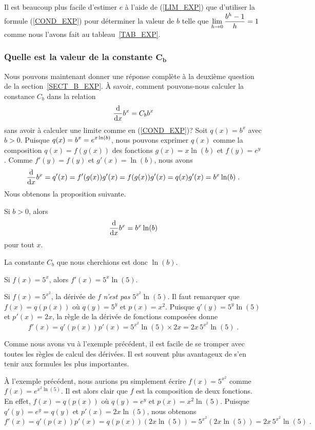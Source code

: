 {\begin{rmk}
Il est beaucoup plus facile d'estimer $e$ à l'aide de (\ref{LIM_EXP})
que d'utiliser la formule (\ref{COND_EXP}) pour déterminer la valeur
de $b$ telle que $\DS \lim_{h\rightarrow 0} \frac{b^h-1}{h} = 1$
comme nous l'avons fait au tableau~\ref{TAB_EXP}.
\end{rmk}

\subsubsection{Quelle est la valeur de la constante $\mathbf{C_b}$}

Nous pouvons maintenant donner une réponse complète à la deuxième question
de la section~\ref{SECT_B_EXP}.  À savoir, comment pouvons-nous calculer la
constance $C_b$ dans la relation
\[
\dfdx{b^x}{x} = C_b b^x
\]
sans avoir à calculer une limite comme en (\ref{COND_EXP})?  Soit
$q(x) = b^x$ avec $b>0$.  Puisque
$\DS q(x) = b^x = e^{x\ln(b)}$, 
nous pouvons exprimer $q(x)$ comme la composition $q(x) = f(g(x))$ des
fonctions $g(x) = x \ln(b)$ et $f(y) = e^y$. Comme
$f'(y) = f(y)$ et $g'(x) = \ln(b)$, nous avons
\[
\dfdx{b^x}{x} = q'(x) = f'(g(x)) g'(x) = f(g(x)) g'(x)
= q(x) g'(x) = b^x \ln(b) \;.
\]
Nous obtenons la proposition suivante.

\begin{prop}\label{BexpX}
Si $b>0$, alors
\[
\dfdx{b^x}{x} = b^x \ln(b)
\]
pour tout $x$.
\end{prop}

La constante $C_b$ que nous cherchions est donc $\ln(b)$.

\begin{egg}
Si $f(x) = 5^x$, alors $f'(x) = 5^x \ln(5)$.
\end{egg}

\begin{egg}
Si $f(x) = 5^{x^2}$, la dérivée de $f$ {\em n'est pas}
$5^{x^2}\ln(5)$.  Il faut remarquer que $f(x) = q(p(x))$ où
$q(y) = 5^y$ et $p(x)=x^2$.  Puisque $q'(y) = 5^y \ln(5)$ et $p'(x) = 2 x$,
la règle de la dérivée de fonctions composées donne
\[
f'(x) = q'(p(x)) p'(x) = 5^{x^2}\ln(5) \times 2x 
= 2x\, 5^{x^2} \ln(5)\; .
\]
\end{egg}

\begin{rmk}
Comme nous avons vu à l'exemple précédent, il est facile de se tromper avec
toutes les règles de calcul des dérivées.  Il est souvent plus
avantageux de s'en tenir aux formules les plus importantes.

À l'exemple précédent, nous aurions pu simplement écrire $f(x) = 5^{x^2}$
comme $f(x) = e^{x^2\ln(5)}$.  Il est alors clair que $f$ est la
composition de deux fonctions.  En effet, $f(x) = q(p(x))$ où $q(y) = e^y$
et $p(x) = x^2 \ln(5)$.  Puisque $q'(y) = e^y = q(y)$ et $p'(x) = 2x \ln(5)$,
nous obtenons
\[
f'(x) = q'(p(x))p'(x) = q({p(x)}) ( 2x \ln(5) )
= 5^{x^2} (2x \ln(5)) = 2x\, 5^{x^2}\ln(5) \; .
\]
\end{rmk}

}

